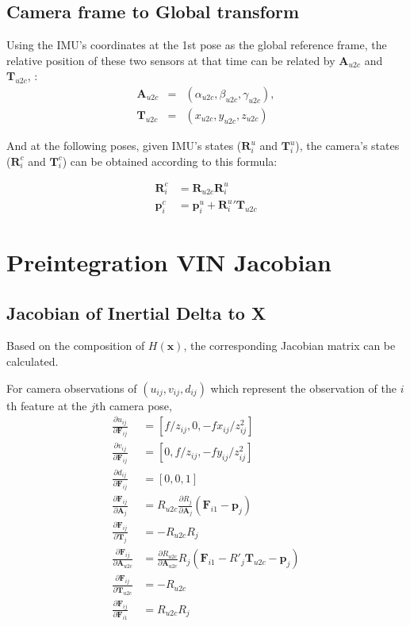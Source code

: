 \documentclass[12pt]{article}   %
\begin{document}
\begin{appendices}
	\subsection{Camera frame to Global transform}	
Using the IMU's coordinates at the 1st pose as the global reference frame, the relative position of these two sensors at that time can be related by $\textbf{A}_{u2c}$ and $\textbf{T}_{u2c}$, : 
\begin{eqnarray*}   %
	\textbf{A}_{u2c} & = & (\alpha_{u2c}, \beta_{u2c}, \gamma_{u2c}), \\
	\textbf{T}_{u2c} & = & (x_{u2c}, y_{u2c}, z_{u2c})
\end{eqnarray*}

And at the following poses, given IMU's states ($\textbf{R}^u_i$ and $\textbf{T}^u_i$), the camera's states ($\textbf{R}^c_i$ and $\textbf{T}^c_i$) can be obtained according to this formula:

\begin{align*}
\textbf{R}^c_i &= \textbf{R}_{u2c} \textbf{R}^u_i \\
\textbf{p}^c_i &= \textbf{p}^u_i + {\textbf{R}^u_i}'  \textbf{T}_{u2c}  
\end{align*} 
	
\section{Preintegration VIN Jacobian}
\label{apn:preintVin}
\subsection{Jacobian of Inertial Delta to X}
Based on the composition of $H(\textbf{x})$, the corresponding Jacobian matrix can be calculated. 

For camera observations of $(u_{ij}, v_{ij}, d_{ij})$ which represent the observation of the $i$th feature at the $j$th camera pose, 
\begin{align}
\frac{\partial u_{ij}}{\partial \textbf{F}_{ij}} &= [f/z_{ij}, 0, -fx_{ij}/z^2_{ij}] \\
\frac{\partial v_{ij}}{\partial \textbf{F}_{ij}} &= [0, f/z_{ij}, -fy_{ij}/z^2_{ij}] \\
\frac{\partial d_{ij}}{\partial \textbf{F}_{ij}} &= [0, 0, 1] \\
\frac{\partial \textbf{F}_{ij}}{\partial \textbf{A}_{j}} &= R_{u2c} \frac{\partial R_{j}}{\partial \textbf{A}_{j}} (\textbf{F}_{i1} - \textbf{p}_{j}) \\
\frac{\partial \textbf{F}_{ij}}{\partial \textbf{T}_{j}} &= -R_{u2c} R_{j} \\
\frac{\partial \textbf{F}_{ij}}{\partial \textbf{A}_{u2c}} &= \frac{\partial R_{u2c}}{\partial \textbf{A}_{u2c}} R_{j}(\textbf{F}_{i1} - R'_{j} \textbf{T}_{u2c} - \textbf{p}_{j}) \\
\frac{\partial \textbf{F}_{ij}}{\partial \textbf{T}_{u2c}} &= -R_{u2c}\\
\frac{\partial \textbf{F}_{ij}}{\partial \textbf{F}_{i1}} &= R_{u2c} R_{j} 
\end{align}


\end{appendices}
\end{document}
